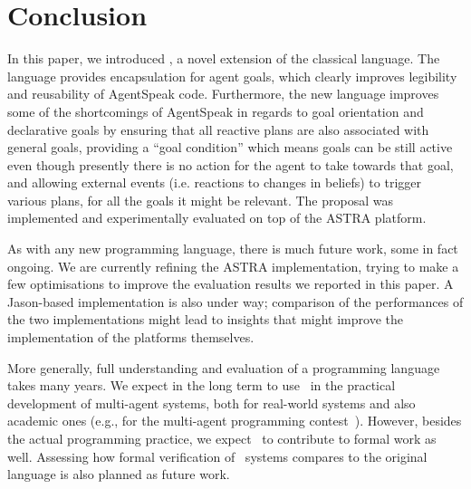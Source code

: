 \section{Conclusion}
\label{sec:conclusion}

In this paper, we introduced \aser, a novel extension of the classical
{\asl} language. The language provides encapsulation for agent
goals, which clearly improves legibility and reusability of AgentSpeak
code. Furthermore, the new language improves some of the shortcomings
of AgentSpeak in regards to goal orientation and declarative goals by
ensuring that all reactive plans are also associated with general
goals, providing a ``goal condition'' which means goals can be still
active even though presently there is no action for the agent to take
towards that goal, and allowing external events (i.e. reactions to
changes in beliefs) to trigger various plans, for all the goals it
might be relevant.  The proposal was implemented and 
experimentally evaluated on top of the ASTRA platform.

As with any new programming language, there is much future work, some
in fact ongoing. We are currently refining the ASTRA implementation,
trying to make a few optimisations to improve the evaluation results we
reported in this paper. A Jason-based implementation is also under
way; comparison of the performances of the two implementations might
lead to insights that might improve the implementation of the platforms
themselves. 

More generally, full understanding and evaluation of a programming
language takes many years. We expect in the long term to use \aser\ in
the practical development of multi-agent systems, both for real-world
systems and also academic ones (e.g., for the multi-agent programming
contest~\cite{Albrecht18}). However, besides the actual programming
practice, we expect \aser\ to contribute to formal work as
well. Assessing how formal verification of \aser\ systems compares to
the original language is also planned as future work.


